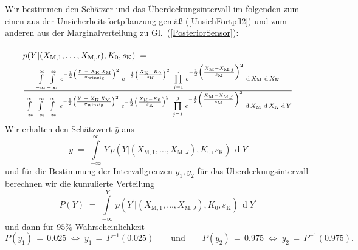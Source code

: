 Wir bestimmen den Schätzer und das Überdeckungsintervall im folgenden zum einen aus der
Unsicherheitsfortpflanzung gemäß (\ref{UnsichFortpfl2})
und zum anderen aus der Marginalverteilung zu Gl.~(\ref{PosteriorSensor}):
\begin{equation}
\arraycolsep=2.0pt\def\arraystretch{2.0}
\begin{array}{l}
p(Y | (X_{\mathrm{M},1}, \dots, X_{\mathrm{M},J}), K_0, s_\mathrm{K}) \; = \;\\
\frac{\int\limits_{-\infty}^\infty \int\limits_{-\infty}^\infty \,
e^{-\frac{1}{2} \left(\frac{ Y \; - \; X_\mathrm{K} \, X_\mathrm{M}}{\sigma_\mathrm{winzig}} \right)^2}
\;  e^{-\frac{1}{2} \left(\frac{X_\mathrm{K} - K_0}{s_\mathrm{K}} \right)^2} \; \prod\limits_{j=1}^J \,
 e^{-\frac{1}{2} \left(\frac{ X_\mathrm{M} - X_{\mathrm{M},j} }{s_\mathrm{M}} \right)^2} \,
\operatorname{d}X_\mathrm{M} \, \operatorname{d}X_\mathrm{K} }
{\int\limits_{-\infty}^\infty  \int\limits_{-\infty}^\infty \int\limits_{-\infty}^\infty \,
e^{-\frac{1}{2} \left(\frac{ Y \; - \; X_\mathrm{K} \, X_\mathrm{M}}{\sigma_\mathrm{winzig}} \right)^2}
\; e^{-\frac{1}{2} \left(\frac{X_\mathrm{K} - K_0}{s_\mathrm{K}} \right)^2} \;\prod\limits_{j=1}^J \,
 e^{-\frac{1}{2} \left(\frac{ X_\mathrm{M} - X_{\mathrm{M},j} }{s_\mathrm{M}} \right)^2} \,
\operatorname{d}X_\mathrm{M} \, \operatorname{d}X_\mathrm{K} \, \operatorname{d}Y}
\end{array}
\end{equation}
Wir erhalten den Schätzwert $\bar y$ aus
\begin{equation}
\bar y \; = \; \int\limits_{-\infty}^\infty \, Y \,
p(Y | (X_{\mathrm{M},1}, \dots, X_{\mathrm{M},J}), K_0, s_\mathrm{K}) \, \operatorname{d}Y
\label{ErwartungswertY}
\end{equation}
und für die Bestimmung der Intervallgrenzen $y_1, y_2$ für das Überdeckungsintervall
berechnen wir die kumulierte Verteilung
\begin{equation}
P(Y) \; = \;  \int\limits_{-\infty}^Y \,
p(Y^\prime | (X_{\mathrm{M},1}, \dots, X_{\mathrm{M},J}), K_0, s_\mathrm{K}) \, \operatorname{d}Y^\prime
\label{cdfBeispiel}
\end{equation}
und dann für $95 \%$ Wahrscheinlichkeit
\begin{equation}
P(y_1) \, = \, 0.025 \; \Leftrightarrow \; y_1 \, = \, P^{-1}(0.025)
\qquad \mathrm{und} \qquad P(y_2) \, = \, 0.975 \;
\Leftrightarrow \;  y_2 \, = \, P^{-1}(0.975) .
\end{equation}


